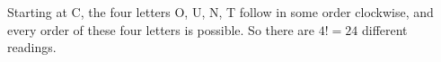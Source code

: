 Starting at C, the four letters O, U, N, T follow in some order clockwise, and every order of these four letters is possible. So there are $4!=\boxed{24}$ different readings.
